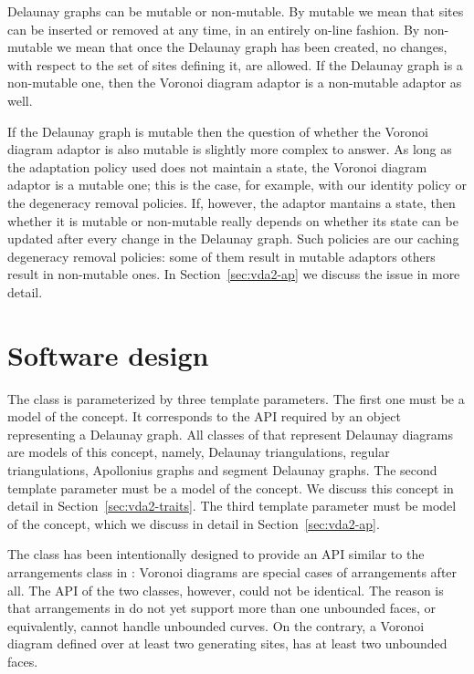Delaunay graphs can be mutable or non-mutable. By mutable we mean that
sites can be inserted or removed at any time, in an entirely on-line
fashion. By non-mutable we mean that once the Delaunay graph has been
created, no changes, with respect to the set of sites defining it,
are allowed. If the Delaunay graph is a non-mutable one, then the
Voronoi diagram adaptor is a non-mutable adaptor as well.

If the Delaunay graph is mutable then the question of whether the
Voronoi diagram adaptor is also mutable is slightly more complex to
answer. As long as the adaptation policy used does not maintain a
state, the Voronoi diagram adaptor is a mutable one; this is the case,
for example, with our identity policy or the degeneracy removal
policies. If, however, the adaptor mantains a state, then whether it
is mutable or non-mutable really depends on whether its state can be
updated after every change in the Delaunay graph. Such policies are
our caching degeneracy removal policies: some of them result in
mutable adaptors others result in non-mutable ones. In
Section~\ref{sec:vda2-ap} we discuss the issue in more detail.




\section{Software design}
\label{sec:vda2-design}

The  class is parameterized by
three template parameters. The first one must be a model of the
 concept. It corresponds to the API required by
an object representing a Delaunay graph. All classes of \cgal{} that
represent Delaunay diagrams are models of this concept, namely,
Delaunay triangulations, regular triangulations, Apollonius 
graphs and segment Delaunay graphs.
%
The second template parameter must be a model of the
 concept. We discuss this concept in detail in
Section~\ref{sec:vda2-traits}.
%
The third template parameter must be model of the
 concept, which we discuss in detail in
Section~\ref{sec:vda2-ap}.

The  class has been
intentionally designed to provide an API similar to the arrangements
class in \cgal: Voronoi diagrams are special cases of arrangements
after all. The API of the two classes, however, could not be
identical. The reason is that arrangements in \cgal{} do not yet support
more than one unbounded faces, or equivalently, cannot handle
unbounded curves. On the contrary, a Voronoi diagram defined over at
least two generating sites, has at least two unbounded faces.

